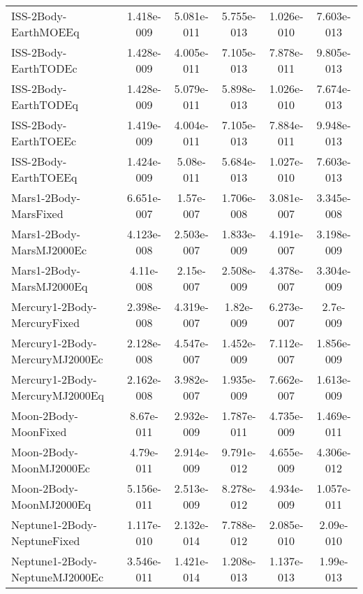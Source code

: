 \begin{table}[htbp!]
\begin{tabular}{lccccc}
         ISS-2Body-EarthMOEEq & 1.418e-009 & 5.081e-011 & 5.755e-013 & 1.026e-010 & 7.603e-013 \\
         ISS-2Body-EarthTODEc & 1.428e-009 & 4.005e-011 & 7.105e-013 & 7.878e-011 & 9.805e-013 \\
         ISS-2Body-EarthTODEq & 1.428e-009 & 5.079e-011 & 5.898e-013 & 1.026e-010 & 7.674e-013 \\
         ISS-2Body-EarthTOEEc & 1.419e-009 & 4.004e-011 & 7.105e-013 & 7.884e-011 & 9.948e-013 \\
         ISS-2Body-EarthTOEEq & 1.424e-009 & 5.08e-011 & 5.684e-013 & 1.027e-010 & 7.603e-013 \\
         Mars1-2Body-MarsFixed & 6.651e-007 & 1.57e-007 & 1.706e-008 & 3.081e-007 & 3.345e-008 \\
         Mars1-2Body-MarsMJ2000Ec & 4.123e-008 & 2.503e-007 & 1.833e-009 & 4.191e-007 & 3.198e-009 \\
         Mars1-2Body-MarsMJ2000Eq & 4.11e-008 & 2.15e-007 & 2.508e-009 & 4.378e-007 & 3.304e-009 \\
         Mercury1-2Body-MercuryFixed & 2.398e-008 & 4.319e-007 & 1.82e-009 & 6.273e-007 & 2.7e-009 \\
         Mercury1-2Body-MercuryMJ2000Ec & 2.128e-008 & 4.547e-007 & 1.452e-009 & 7.112e-007 & 1.856e-009 \\
         Mercury1-2Body-MercuryMJ2000Eq & 2.162e-008 & 3.982e-007 & 1.935e-009 & 7.662e-007 & 1.613e-009 \\
         Moon-2Body-MoonFixed & 8.67e-011 & 2.932e-009 & 1.787e-011 & 4.735e-009 & 1.469e-011 \\
         Moon-2Body-MoonMJ2000Ec & 4.79e-011 & 2.914e-009 & 9.791e-012 & 4.655e-009 & 4.306e-012 \\
         Moon-2Body-MoonMJ2000Eq & 5.156e-011 & 2.513e-009 & 8.278e-012 & 4.934e-009 & 1.057e-011 \\
         Neptune1-2Body-NeptuneFixed & 1.117e-010 & 2.132e-014 & 7.788e-012 & 2.085e-010 & 2.09e-010 \\
         Neptune1-2Body-NeptuneMJ2000Ec & 3.546e-011 & 1.421e-014 & 1.208e-013 & 1.137e-013 & 1.99e-013 \\

\end{tabular}
\end{table}
